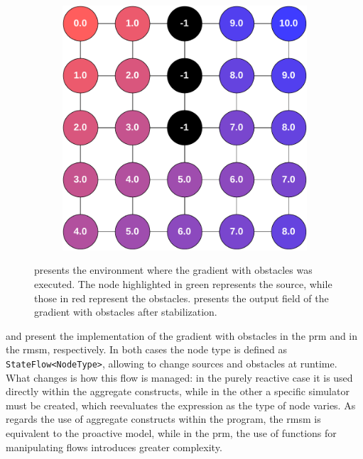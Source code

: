 \begin{figure}[ht!]
\begin{subfigure}[b]{.49\textwidth}
        \caption{}
        \label{fig:gradient-envronment}
    \end{subfigure}
    \hfill
    \begin{subfigure}[b]{.49\textwidth}
        \centering
        \includegraphics[width=\textwidth]{figures/gradient-environment-execution.pdf}
        \caption{}
        \label{fig:gradient-envronment-execution}
    \end{subfigure}
    \caption{ presents the environment where the gradient with obstacles was executed. The node highlighted in green represents the source, while those in red represent the obstacles.  presents the output field of the gradient with obstacles after stabilization.}
    \label{fig:gradient-environment-and-execution}
\end{figure}

 and  present the implementation of the gradient with obstacles in the \ac{prm} and in the \ac{rmsm}, respectively. In both cases the node type is defined as \texttt{StateFlow<NodeType>}, allowing to change sources and obstacles at runtime. What changes is how this flow is managed: in the purely reactive case it is used directly within the aggregate constructs, while in the other a specific simulator must be created, which reevaluates the expression as the type of node varies. As regards the use of aggregate constructs within the program, the \ac{rmsm} is equivalent to the proactive model, while in the \ac{prm}, the use of functions for manipulating flows introduces greater complexity.

